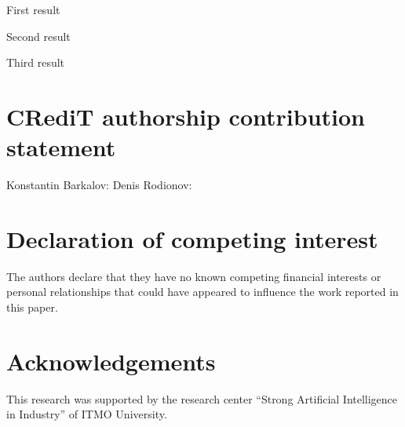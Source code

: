 \documentclass[preprint,12pt]{elsarticle}
\begin{document}
First result

Second result 

Third result





\section*{CRediT authorship contribution statement}

Konstantin Barkalov:
Denis Rodionov: 


\section*{Declaration of competing interest}

The authors declare that they have no known competing financial interests or personal relationships that could have appeared to influence the work reported in this paper.

\section*{Acknowledgements}

This research was supported by the research center ``Strong Artificial Intelligence in Industry'' of ITMO University.





 






\end{document}
